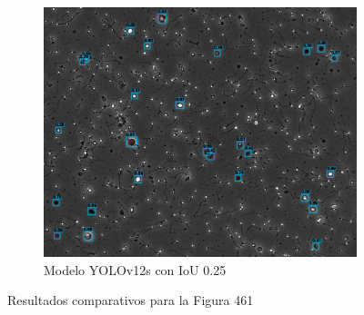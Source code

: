 \documentclass[12pt,a4paper,onecolumn,oneside]{report}
\begin{document}
\begin{figure}[H]
  \vspace{0.3cm}
  \begin{subfigure}[b]{0.48\textwidth}
    \centering
    \includegraphics[width=\textwidth]{figuras/evaluacion_cualitativa/461/461_v12_IoU0.25.jpg}
    \caption{Modelo YOLOv12s con IoU 0.25}
    \label{figyolov12s_IoU0.25_image_461}
  \end{subfigure}
  
  \caption{Resultados comparativos para la Figura 461}
  \label{fig:461}
\end{figure}
\end{document}
